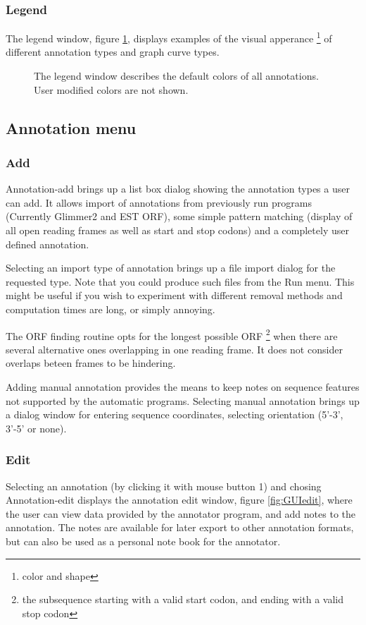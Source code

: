 \subsubsection{Legend}
The legend window, figure \ref{fig:GUIlegend}, displays examples of the visual apperance
\footnote{color and shape} of different annotation types and graph
curve types.
\begin{figure}[htbp]
	\begin{center}
	\end{center}
\caption{The legend window describes the default colors of all annotations. User modified colors are not shown.}
\label{fig:GUIlegend}
\end{figure}

\subsection{Annotation menu}

\subsubsection{Add}
Annotation-add brings up a list box dialog showing the annotation
types a user can add. It allows import of annotations from previously
run programs (Currently Glimmer2 and EST ORF), some simple pattern
matching (display of all open reading frames as well as start and stop
codons) and a completely user defined annotation.

Selecting an import type of annotation brings up a file import dialog
for the requested type. Note that you could produce such files from
the Run menu. This might be useful if you wish to experiment with
different removal methods and computation times are long, or simply
annoying.

The ORF finding routine opts for the longest possible ORF
\footnote{the subsequence starting with a valid start codon, and
ending with a valid stop codon} when there are several alternative
ones overlapping in one reading frame. It does not consider overlaps
beteen frames to be hindering.

Adding manual annotation provides the means to keep notes on sequence
features not supported by the automatic programs. Selecting manual
annotation brings up a dialog window for entering sequence
coordinates, selecting orientation (5'-3', 3'-5' or none).

\subsubsection{Edit}
Selecting an annotation (by clicking it with mouse button 1) and
chosing Annotation-edit displays the annotation edit window, figure \ref{fig:GUIedit}, where the
user can view data provided by the annotator program, and add notes to
the annotation. The notes are available for later export to other
annotation formats, but can also be used as a personal note book for
the annotator.

